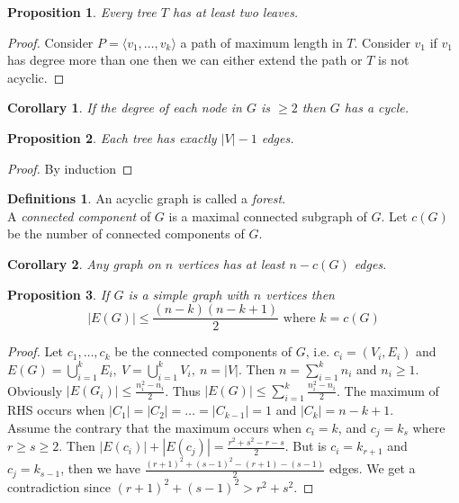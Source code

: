 \documentclass{article}
\newtheorem*{cor}{Corollary}
\newtheorem*{prop}{Proposition}
\theoremstyle{definition}
\newtheorem*{defns}{Definitions}
\begin{document}
\begin{prop}
Every tree $T$ has at least two leaves.
\end{prop}

\begin{proof}
Consider $P=\langle v_1,\ldots,v_k\rangle$ a path of maximum length in $T$.
Consider $v_1$ if $v_1$ has degree more than one then we can either extend the path or $T$ is not acyclic.
\end{proof}


\begin{cor}
If the degree of each node in $G$ is $\ge 2$ then $G$ has a cycle.
\end{cor}

\begin{prop}
Each tree has exactly $|V| -1$ edges.
\end{prop}

\begin{proof}
\lbrack By induction\rbrack
\end{proof}

\begin{defns}
An acyclic graph is called a \emph{forest}.\\
A \emph{connected component} of $G$ is a maximal connected subgraph of $G$.
Let $c(G)$ be the number of connected components of $G$. %
\end{defns}

\begin{cor}
Any graph on $n$ vertices has at least $n-c(G)$ edges.
\end{cor}

\begin{prop}
If $G$ is a simple graph with $n$ vertices then
$$|E(G)| \le \frac{(n-k)(n-k+1)}{2} \text{ where }k=c(G)$$
\end{prop}

\begin{proof}
Let $c_1,\ldots,c_k$ be the connected components of $G$, i.e. $c_i=(V_i,E_i)$ and $E(G) = \bigcup_{i=1}^k E_i,\ V=\bigcup_{i=1}^k V_i,\ n=|V|$.
Then $n=\sum_{i=1}^k n_i$ and $n_i \ge 1$.
Obviously $|E(G_i)| \le \frac{n_i^2 -n_i}{2}$.
Thus $|E(G)| \le \sum_{i=1}^k \frac{n_i^2-n_i}{2}$.
The maximum of RHS occurs when $|C_1| = |C_2| = \ldots = |C_{k-1}| = 1$ and $|C_k| = n-k +1$. \\
Assume the contrary that the maximum occurs when $c_i = k$, and $c_j = k_s$ where $r\ge s \ge 2$.
Then $|E(c_i)| + |E(c_j)| = \frac{r^2 + s^2 - r -s}{2}$.
But is $c_i = k_{r+1}$ and $c_j = k_{s-1}$, then we have $\frac{(r+1)^2 + (s-1)^2 - (r+1) -(s-1)}{2}$ edges.
We get a contradiction since $(r+1)^2 + (s-1)^2 > r^2 + s^2$.
\end{proof}
\end{document}
